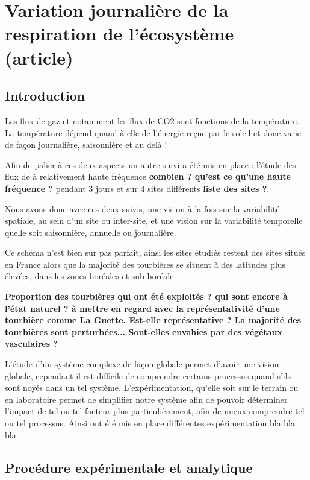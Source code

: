 \chapter{Variation journalière de la respiration de l'écosystème (article)}

\minitoc

\newpage

\section{Introduction}
Les flux de gaz et notamment les flux de CO2 sont fonctions de la température.
La température dépend quand à elle de l'énergie reçue par le soleil et donc varie de façon journalière, saisonnière et au delà !

Afin de palier à ces deux aspects un autre suivi a été mis en place : l'étude des flux de \coo à relativement haute fréquence \textbf{combien ? qu'est ce qu'une haute fréquence ?} pendant 3 jours et sur 4 sites différents \textbf{liste des sites ?}.

Nous avons donc avec ces deux suivis, une vision à la fois sur la variabilité spatiale, au sein d'un site ou inter-site, et une vision sur la variabilité temporelle quelle soit saisonnière, annuelle ou journalière.

Ce schéma n'est bien sur pas parfait, ainsi les sites étudiés restent des sites situés en France alors que la majorité des tourbières se situent à des latitudes plus élevées, dans les zones boréales et sub-boréale.

\textbf{Proportion des tourbières qui ont été exploités ? qui sont encore à l'état naturel ? à mettre en regard avec la représentativité d'une tourbière comme La Guette. Est-elle représentative ? La majorité des tourbières sont perturbées... Sont-elles envahies par des végétaux vasculaires ?}

L'étude d'un système complexe de façon globale permet d'avoir une vision globale, cependant il est difficile de comprendre certains processus quand s'ils sont noyés dans un tel système. 
L'expérimentation, qu'elle soit sur le terrain ou en laboratoire permet de simplifier notre système afin de pouvoir déterminer l'impact de tel ou tel facteur plus particulièrement, afin de mieux comprendre tel ou tel processus.
Ainsi ont été mis en place différentes expérimentation bla bla bla.

\section{Procédure expérimentale et analytique}

